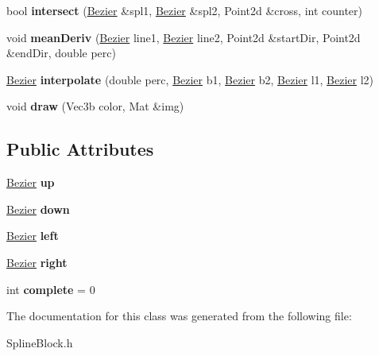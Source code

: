 \begin{DoxyCompactItemize}
bool {\bfseries intersect} (\mbox{\hyperlink{class_bezier}{Bezier}} \&spl1, \mbox{\hyperlink{class_bezier}{Bezier}} \&spl2, Point2d \&cross, int counter)
\item 
\mbox{\label{class_spline_block_a97b626966e1b2050d9e82a8e8f740180}} 
void {\bfseries mean\+Deriv} (\mbox{\hyperlink{class_bezier}{Bezier}} line1, \mbox{\hyperlink{class_bezier}{Bezier}} line2, Point2d \&start\+Dir, Point2d \&end\+Dir, double perc)
\item 
\mbox{\label{class_spline_block_aae0d36df9a11575e0276817a017f1d1a}} 
\mbox{\hyperlink{class_bezier}{Bezier}} {\bfseries interpolate} (double perc, \mbox{\hyperlink{class_bezier}{Bezier}} b1, \mbox{\hyperlink{class_bezier}{Bezier}} b2, \mbox{\hyperlink{class_bezier}{Bezier}} l1, \mbox{\hyperlink{class_bezier}{Bezier}} l2)
\item 
\mbox{\label{class_spline_block_a0a2e2396afba537e1c41c88c9954b5ec}} 
void {\bfseries draw} (Vec3b color, Mat \&img)
\end{DoxyCompactItemize}
\subsection*{Public Attributes}
\begin{DoxyCompactItemize}
\item 
\mbox{\label{class_spline_block_adbbe7ccfd07237465b86827ce6dfb634}} 
\mbox{\hyperlink{class_bezier}{Bezier}} {\bfseries up}
\item 
\mbox{\label{class_spline_block_a002108d1371f9d1be9722e06720d9407}} 
\mbox{\hyperlink{class_bezier}{Bezier}} {\bfseries down}
\item 
\mbox{\label{class_spline_block_a34b58901045e702e57e90cd6791ed910}} 
\mbox{\hyperlink{class_bezier}{Bezier}} {\bfseries left}
\item 
\mbox{\label{class_spline_block_ad8cf958d052f9e2ac5519ffade664d6d}} 
\mbox{\hyperlink{class_bezier}{Bezier}} {\bfseries right}
\item 
\mbox{\label{class_spline_block_add5b72e47475f9e1dbb05b80c9f6588f}} 
int {\bfseries complete} = 0
\end{DoxyCompactItemize}


The documentation for this class was generated from the following file\+:\begin{DoxyCompactItemize}
\item 
Spline\+Block.\+h\end{DoxyCompactItemize}
